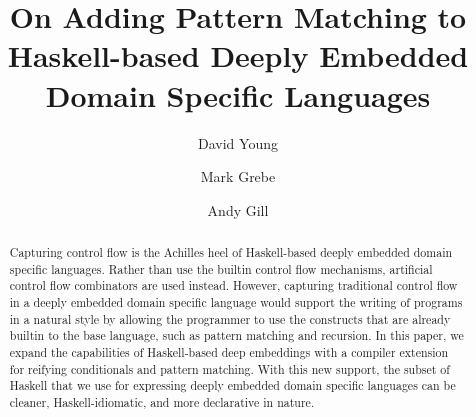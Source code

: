 \documentclass[runningheads, a4paper]{llncs}
\begin{document}
\title{On Adding Pattern Matching to Haskell-based
  Deeply Embedded Domain Specific Languages}


\author{David Young \and Mark Grebe \and Andy Gill}

\maketitle







\begin{abstract}
  Capturing control flow is the Achilles heel of Haskell-based
  deeply embedded domain specific languages.
  Rather than use
  the builtin control flow mechanisms, artificial control flow combinators
  are used instead.
  However, capturing traditional control flow in a deeply embedded domain specific language
  would support the writing of programs in a natural style by allowing the programmer to use the
  constructs that are already builtin to the base language, such as pattern
  matching and recursion.
  In this paper, we expand the capabilities of
  Haskell-based deep embeddings with a compiler extension
  for reifying conditionals and pattern matching.
  With this new support, the subset of Haskell that we use for expressing
  deeply embedded domain specific languages can be cleaner, Haskell-idiomatic,
  and more declarative in nature.

\end{abstract}
\end{document}
